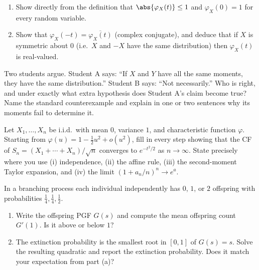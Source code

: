 \begin{exercise}[CF basics]
\label{ch18:ex-cf-basics}
\begin{enumerate}[label=(\alph*)]
  \item Show directly from the definition that $\abs{\varphi_X(t)}\le 1$ and
        $\varphi_X(0)=1$ for every random variable.
  \item Show that $\varphi_X(-t)=\overline{\varphi_X(t)}$ (complex conjugate),
        and deduce that if $X$ is symmetric about $0$ (i.e.\ $X$ and $-X$ have
        the same distribution) then $\varphi_X(t)$ is real-valued.
\end{enumerate}
\end{exercise}

\begin{exercise}
\label{ch18:ex-uniqueness}
Two students argue. Student A says: ``If $X$ and $Y$ have all the same moments,
they have the same distribution.'' Student B says: ``Not necessarily.'' Who is
right, and under exactly what extra hypothesis does Student A's claim become
true? Name the standard counterexample and explain in one or two sentences why
its moments fail to determine it.
\end{exercise}

\begin{exercise}
\label{ch18:ex-clt}
Let $X_1,\dots,X_n$ be i.i.d.\ with mean $0$, variance $1$, and characteristic
function $\varphi$. Starting from $\varphi(u)=1-\tfrac12 u^2 + o(u^2)$, fill in
every step showing that the CF of $S_n=(X_1+\cdots+X_n)/\sqrt n$ converges to
$e^{-t^2/2}$ as $n\to\infty$. State precisely where you use (i) independence,
(ii) the affine rule, (iii) the second-moment Taylor expansion, and (iv) the
limit $(1+a_n/n)^n\to e^a$.
\end{exercise}

\begin{exercise}
\label{ch18:ex-branching}
In a branching process each individual independently has $0$, $1$, or $2$
offspring with probabilities $\tfrac14,\tfrac14,\tfrac12$.
\begin{enumerate}[label=(\alph*)]
  \item Write the offspring PGF $G(s)$ and compute the mean offspring count
        $G'(1)$. Is it above or below $1$?
  \item The extinction probability is the smallest root in $[0,1]$ of
        $G(s)=s$. Solve the resulting quadratic and report the extinction
        probability. Does it match your expectation from part (a)?
\end{enumerate}
\end{exercise}
